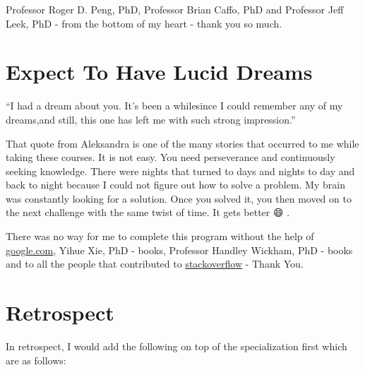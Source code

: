 \documentclass[
]{book}
\begin{document}
Professor Roger D. Peng, PhD, Professor Brian Caffo, PhD and Professor Jeff Leek, PhD - from the bottom of my heart - thank you so much.

\hypertarget{expect-to-have-lucid-dreams}{%
\section*{Expect To Have Lucid Dreams}\label{expect-to-have-lucid-dreams}}

``I had a dream about you. It's been a whilesince I could remember any of my dreams,and still, this one has left me with such strong impression.\citep{ninkovic}''

That quote from Aleksandra is one of the many stories that occurred to me while taking these courses. It is not easy. You need perseverance and continuously seeking knowledge. There were nights that turned to days and nights to day and back to night because I could not figure out how to solve a problem. My brain was constantly looking for a solution. Once you solved it, you then moved on to the next challenge with the same twist of time. It gets better 😄 \citep{emo}.

There was no way for me to complete this program without the help of \href{https://google.com}{google.com}, Yihue Xie, PhD - books, Professor Handley Wickham, PhD - books and to all the people that contributed to \href{https://stackoverflow.com/}{stackoverflow} - Thank You.

\hypertarget{retrospect}{%
\section*{Retrospect}\label{retrospect}}

In retrospect, I would add the following on top of the specialization first which are as follows:
\end{document}
